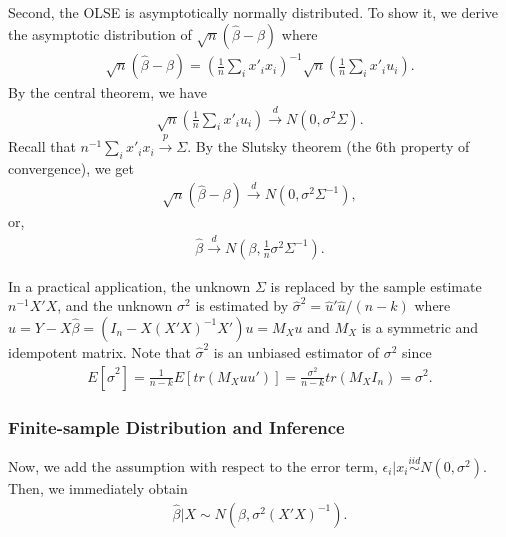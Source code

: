 \documentclass[
  12pt,
]{article}
\begin{document}
Second, the OLSE is asymptotically normally distributed. To show it, we
derive the asymptotic distribution of \(\sqrt{n}(\hat{\beta} - \beta)\)
where \begin{align*}
  \sqrt{n}(\hat{\beta} - \beta) = \left( \frac{1}{n} \sum_i x'_i x_i \right)^{-1} \sqrt{n} \left( \frac{1}{n} \sum_i x'_i u_i \right).
\end{align*} By the central theorem, we have \begin{align*}
  \sqrt{n} \left( \frac{1}{n} \sum_i x'_i u_i \right) \overset{d}{\to} N(0, \sigma^2 \Sigma).
\end{align*} Recall that
\(n^{-1} \sum_i x'_i x_i \overset{p}{\to} \Sigma\). By the Slutsky
theorem (the 6th property of convergence), we get \begin{align*}
  \sqrt{n}(\hat{\beta} - \beta) \overset{d}{\to} N(0, \sigma^2 \Sigma^{-1}),
\end{align*} or, \begin{align*}
  \hat{\beta} \overset{d}{\to} N \left(\beta, \frac{1}{n} \sigma^2 \Sigma^{-1} \right).
\end{align*}

In a practical application, the unknown \(\Sigma\) is replaced by the
sample estimate \(n^{-1} X'X\), and the unknown \(\sigma^2\) is
estimated by \(\hat{\sigma}^2 = \hat{u}'\hat{u}/(n-k)\) where
\(\hat{u} = Y - X \hat{\beta} = (I_n - X(X'X)^{-1}X')u = M_X u\) and
\(M_X\) is a symmetric and idempotent matrix. Note that
\(\hat{\sigma}^2\) is an unbiased estimator of \(\sigma^2\) since
\begin{align*}
  E[ \hat{\sigma}^2 ] = \frac{1}{n-k} E[tr(M_X uu')] = \frac{\sigma^2}{n-k} tr(M_X I_n) = \sigma^2. 
\end{align*}

\hypertarget{finite-sample-distribution-and-inference}{%
\subsubsection{Finite-sample Distribution and
Inference}\label{finite-sample-distribution-and-inference}}

Now, we add the assumption with respect to the error term,
\(\epsilon_i |x_i \overset{iid}{\sim} N(0, \sigma^2)\). Then, we
immediately obtain \begin{align*}
  \hat{\beta}|X \sim N(\beta, \sigma^2(X'X)^{-1}).
\end{align*}
\end{document}
